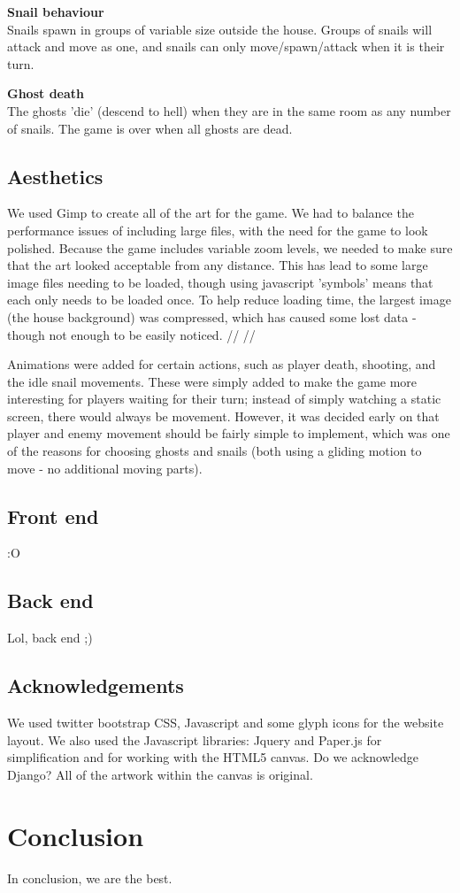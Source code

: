 \documentclass{article}
\begin{document}
\textbf{Snail behaviour} \\
Snails spawn in groups of variable size outside the house. Groups of snails will attack and move as one, and snails can only move/spawn/attack when it is their turn.

\textbf{Ghost death} \\
The ghosts 'die' (descend to hell) when they are in the same room as any number of snails. The game is over when all ghosts are dead.

\subsection{Aesthetics}
We used Gimp to create all of the art for the game. We had to balance the performance issues of including large files, with the need for the game to look polished. Because the game includes variable zoom levels, we needed to make sure that the art looked acceptable from any distance. This has lead to some large image files needing to be loaded, though using javascript 'symbols' means that each only needs to be loaded once. To help reduce loading time, the largest image (the house background) was compressed, which has caused some lost data - though not enough to be easily noticed. // // 

Animations were added for certain actions, such as player death, shooting, and the idle snail movements. These were simply added to make the game more interesting for players waiting for their turn; instead of simply watching a static screen, there would always be movement. However, it was decided early on that player and enemy movement should be fairly simple to implement, which was one of the reasons for choosing ghosts and snails (both using a gliding motion to move - no additional moving parts).

\subsection{Front end}
:O
\subsection{Back end}
Lol, back end ;)
\subsection{Acknowledgements}
We used twitter bootstrap CSS, Javascript and some glyph icons for the website layout. We also used the Javascript libraries: Jquery and Paper.js for simplification and for working with the HTML5 canvas. Do we acknowledge Django? All of the artwork within the canvas is original.

\section{Conclusion}
In conclusion, we are the best.
\end{document}
